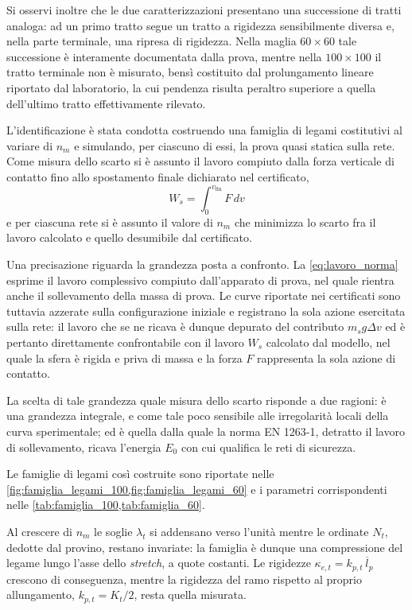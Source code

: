 Si osservi inoltre che le due caratterizzazioni presentano una successione di tratti analoga: ad un primo tratto segue un tratto a rigidezza sensibilmente diversa e, nella parte terminale, una ripresa di rigidezza. Nella maglia $60\times60$ tale successione è interamente documentata dalla prova, mentre nella $100\times100$ il tratto terminale non è misurato, bensì costituito dal prolungamento lineare riportato dal laboratorio, la cui pendenza risulta peraltro superiore a quella dell'ultimo tratto effettivamente rilevato. 

L'identificazione è stata condotta costruendo una famiglia di legami costitutivi al variare di $n_m$ e simulando, per ciascuno di essi, la prova quasi statica sulla rete. Come misura dello scarto si è assunto il lavoro compiuto dalla forza verticale di contatto fino allo spostamento finale dichiarato nel certificato, 
\begin{equation}
    W_s = \int_{0}^{v_{\text{fin}}} F\, dv
    \label{eq:energia_criterio}
\end{equation}
e per ciascuna rete si è assunto il valore di $n_m$ che minimizza lo scarto fra il lavoro calcolato e quello desumibile dal certificato. 

Una precisazione riguarda la grandezza posta a confronto. La \eqref{eq:lavoro_norma} esprime il lavoro complessivo compiuto dall'apparato di prova, nel quale rientra anche il sollevamento della massa di prova. Le curve riportate nei certificati sono tuttavia azzerate sulla configurazione iniziale e registrano la sola azione esercitata sulla rete: il lavoro che se ne ricava è dunque depurato del contributo $m_{s} g \Delta v$ ed è pertanto direttamente confrontabile con il lavoro $W_s$ calcolato dal modello, nel quale la sfera è rigida e priva di massa e la forza $F$ rappresenta la sola azione di contatto.

La scelta di tale grandezza quale misura dello scarto risponde a due ragioni: è una grandezza integrale, e come tale poco sensibile alle irregolarità locali della curva sperimentale; ed è quella dalla quale la norma EN 1263-1, detratto il lavoro di sollevamento, ricava l'energia $E_0$ con cui qualifica le reti di sicurezza. 

Le famiglie di legami così costruite sono riportate nelle \cref{fig:famiglia_legami_100,fig:famiglia_legami_60} e i parametri corrispondenti nelle \cref{tab:famiglia_100,tab:famiglia_60}. 

Al crescere di $n_m$ le soglie $\lambda_t$ si addensano verso l'unità mentre le ordinate $N_t$, dedotte dal provino, restano invariate: la famiglia è dunque una compressione del legame lungo l'asse dello \textit{stretch}, a quote costanti. Le rigidezze $\kappa_{e,t} = k_{p,t}\,\overline{l}_p$ crescono di conseguenza, mentre la rigidezza del ramo rispetto al proprio allungamento, $k_{p,t} = K_t/2$, resta quella misurata.

